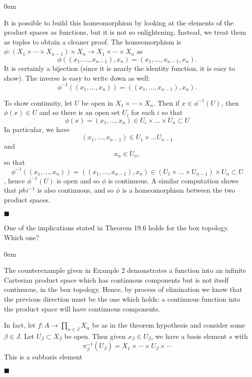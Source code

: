 \documentclass[12pt]{article}
\renewcommand{\qed}{\hfill$\blacksquare$}
\renewenvironment{proof}{\begin{addmargin}[1em]{0em}\begin{newproof}}{\end{newproof}\end{addmargin}\qed}
\newenvironment{problem}[2][Exercise]{\begin{trivlist}
\item[\hskip \labelsep {\bfseries #1}\hskip \labelsep {\bfseries #2.}]}{\end{trivlist}}
\begin{document}
\begin{proof}
	It is possible to build this homeomorphism by looking at the elements of the product spaces as functions, but it is not so enlightening. Instead, we treat them as tuples to obtain a cleaner proof. The homeomorphism is $\phi: \left(X_1\times \cdots \times X_{n-1}\right)\times X_n \rightarrow X_1 \times \cdots \times X_n$ as  $$ \phi\left(\left(x_1,\ldots,x_{n-1}\right),x_n\right) = \left(x_1,\ldots,x_{n-1}, x_n\right).$$ It is certainly a bijection (since it is nearly the identity function, it is easy to show). The inverse is easy to write down as well: $$ \phi^{-1}\left(\left(x_1,\ldots,x_n\right)\right) = \left(\left(x_1,\ldots,x_{n-1}\right),x_n\right).$$ 
	
	To show continuity, let $U$ be open in $X_1\times \cdots \times X_n$. Then if $x\in \phi^{-1}\left(U\right)$, then $\phi\left(x\right) \in U$ and so there is an open set $U_i$ for each $i$ so that $$ \phi\left(x\right) = \left(x_1,\ldots,x_n\right) \in U_i \times \ldots \times U_n \subset U $$ In particular, we have $$\left(x_1,\ldots,x_{n-1}\right) \in U_1 \times \ldots U_{n-1} $$ and $$ x_n \in U_n,$$ so that $$\phi^{-1}\left(\left(x_1,\ldots,x_n\right)\right) = \left(\left(x_1,\ldots,x_{n-1}\right),x_n\right) \in \left(U_1\times \ldots \times U_{n-1}\right) \times U_n \subset U$$, hence $\phi^{-1}\left(U\right)$ is open and so $\phi$ is continuous. A similar computation shows that $phi^{-1}$ is also continuous, and so $\phi$ is a homeomorphism between the two product spaces.
\end{proof}


\begin{problem}{19.5}
	One of the implications stated in Theorem 19.6 holds for the box topology. Which one?
\end{problem}
\begin{proof}
	The counterexample given in Example 2 demonstrates a function into an infinite Cartesian product space which has continuous components but is not itself continuous, in the box topology. Hence, by process of elimination we know that the previous direction must be the one which holds: a continuous function into the product space will have continuous components.
	
	In fact, let $f:A\rightarrow \prod_{\alpha \in J} X_{\alpha}$ be as in the theorem hypothesis and consider some $\beta \in J$. Let $U_{\beta}\subset X_{\beta}$ be open. Then given $x_{\beta} \in U_{\beta}$, we have a basis element $s$ with  $$ \pi_{\beta}^{-1}\left(U_{\beta}\right) = X_1 \times \cdots \times U_{\beta} \times \cdots $$ This is a subbasis element 
\end{proof}
\end{document}
